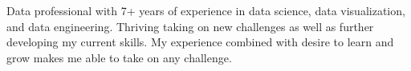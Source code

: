 

\begin{cvparagraph}

Data professional with 7+ years of experience in data science, data visualization, and data engineering. Thriving taking on new challenges as well as further developing my current skills. My experience combined with desire to learn and grow makes me able to take on any challenge. 
\end{cvparagraph}
